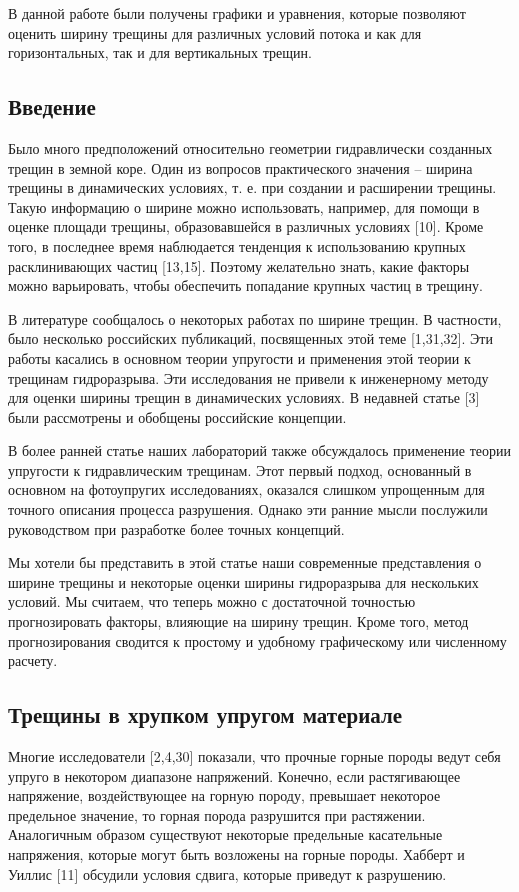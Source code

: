 \documentclass[a4paper, 12pt]{article}
\begin{document}
В данной работе были получены графики и уравнения, которые позволяют оценить ширину трещины для различных условий потока и как для горизонтальных, так и для вертикальных трещин.

\subsection{Введение}

Было много предположений относительно геометрии гидравлически созданных трещин в земной коре.
Один из вопросов практического значения – ширина трещины в динамических условиях, т. е. при создании и расширении трещины.
Такую информацию о ширине можно использовать, например, для помощи в оценке площади трещины, образовавшейся в различных условиях [10].
Кроме того, в последнее время наблюдается тенденция к использованию крупных расклинивающих частиц [13,15]. Поэтому желательно знать, какие факторы можно варьировать, чтобы обеспечить попадание крупных частиц в трещину.

В литературе сообщалось о некоторых работах по ширине трещин.
В частности, было несколько российских публикаций, посвященных этой теме [1,31,32].
Эти работы касались в основном теории упругости и применения этой теории к трещинам гидроразрыва.
Эти исследования не привели к инженерному методу для оценки ширины трещин в динамических условиях.
В недавней статье [3] были рассмотрены и обобщены российские концепции.

В более ранней статье наших лабораторий также обсуждалось применение теории упругости к гидравлическим трещинам.
Этот первый подход, основанный в основном на фотоупругих исследованиях, оказался слишком упрощенным для точного описания процесса разрушения. Однако эти ранние мысли послужили руководством при разработке более точных концепций.

Мы хотели бы представить в этой статье наши современные представления о ширине трещины и некоторые оценки ширины гидроразрыва для нескольких условий.
Мы считаем, что теперь можно с достаточной точностью прогнозировать факторы, влияющие на ширину трещин.
Кроме того, метод прогнозирования сводится к простому и удобному графическому или численному расчету.

\subsection{Трещины в хрупком упругом материале}

Многие исследователи [2,4,30] показали, что прочные горные породы ведут себя упруго в некотором диапазоне напряжений.
Конечно, если растягивающее напряжение, воздействующее на горную породу, превышает некоторое предельное значение, то горная порода разрушится при растяжении.
Аналогичным образом существуют некоторые предельные касательные напряжения, которые могут быть возложены на горные породы.
Хабберт и Уиллис [11] обсудили условия сдвига, которые приведут к разрушению.
\end{document}
